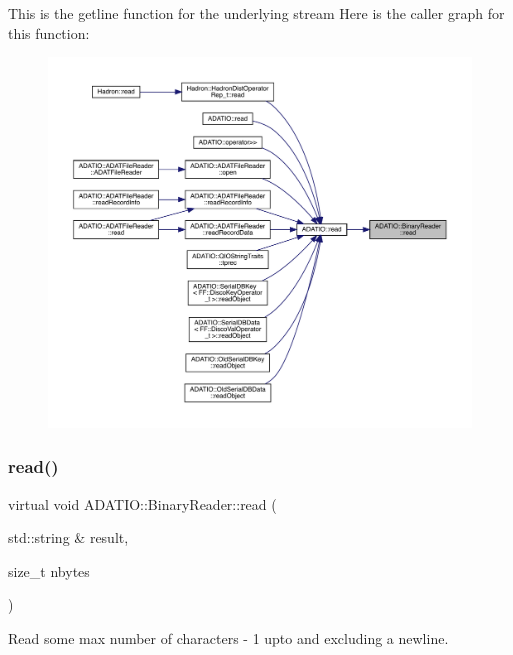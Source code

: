 This is the getline function for the underlying stream Here is the caller graph for this function\+:
\nopagebreak
\begin{figure}[H]
\begin{center}
\leavevmode
\includegraphics[width=350pt]{da/dd9/classADATIO_1_1BinaryReader_a4d79cabea18fccc818eaf2c45ed21b1f_icgraph}
\end{center}
\end{figure}
\mbox{\label{classADATIO_1_1BinaryReader_a4d79cabea18fccc818eaf2c45ed21b1f}} 
\subsubsection{\texorpdfstring{read()}{read()}\hspace{0.1cm}{\footnotesize\ttfamily [2/33]}}
{\footnotesize\ttfamily virtual void A\+D\+A\+T\+I\+O\+::\+Binary\+Reader\+::read (\begin{DoxyParamCaption}\item[{std\+::string \&}]{result,  }\item[{size\+\_\+t}]{nbytes }\end{DoxyParamCaption})\hspace{0.3cm}{\ttfamily [virtual]}}



Read some max number of characters -\/ 1 upto and excluding a newline. 

